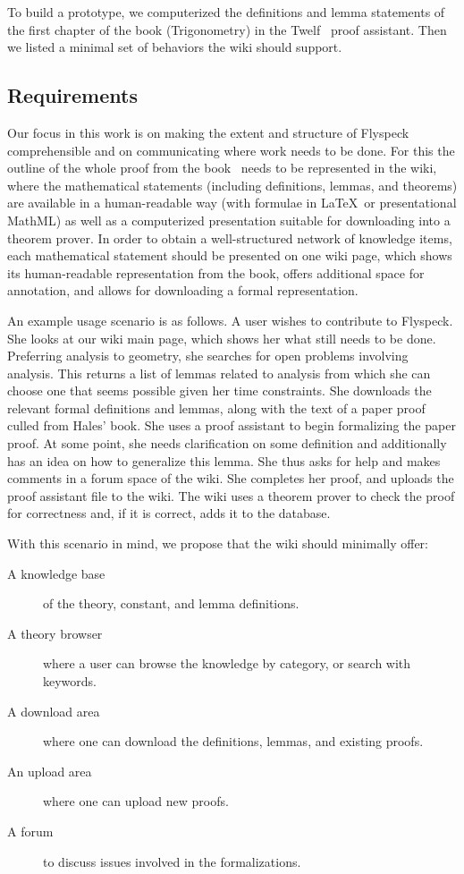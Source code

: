 To build a prototype, we computerized the definitions and lemma statements of
the first chapter of the book (Trigonometry) in the
Twelf~\cite{Schurmann:1999:Twelf} proof assistant.  Then we
listed a minimal set of behaviors the wiki should support.

\subsection{Requirements}

Our focus in this work is on making the extent and structure of
Flyspeck comprehensible and on communicating where work needs to be
done.  For this the outline of the whole proof from the
book~\cite{Hales:2007:FlyspeckBook} needs to be represented in the
wiki, where the mathematical statements (including definitions,
lemmas, and theorems) are available in a human-readable way (with
formulae in \LaTeX\ or presentational MathML) as well as a
computerized presentation suitable for downloading into a theorem
prover.  In order to obtain a well-structured network of knowledge
items, each mathematical statement should be presented on one wiki
page, which shows its human-readable representation from the book,
offers additional space for annotation, and allows for downloading a
formal representation.  

An example usage scenario is as follows. A user wishes to contribute to
Flyspeck.  She looks at our wiki main page, which shows her what still needs to
be done.  Preferring analysis to geometry, she searches for open problems
involving analysis.  This returns a list of lemmas related to analysis from
which she can choose one that seems possible given her time constraints. She
downloads the relevant formal definitions and lemmas, along with the text of a
paper proof culled from Hales' book.  She uses a proof assistant to begin
formalizing the paper proof.  At some point, she needs
clarification on some definition and additionally has an idea on how to
generalize this lemma.  She thus asks for help and makes comments in a forum
space of the wiki.  She completes her proof, and uploads the proof assistant
file to the wiki.  The wiki uses a theorem prover to check the proof for
correctness and, if it is correct, adds it to the database.

With this scenario in mind, we propose that the wiki should minimally offer: 
\begin{description}
\item[A knowledge base] of the theory, constant, and lemma definitions.
\item[A theory browser] where a user can browse the knowledge by category, or search with keywords.
\item[A download area] where one can download the definitions, lemmas, and existing proofs.
\item[An upload area] where one can upload new proofs.
\item[A forum] to discuss issues involved in the formalizations.
\end{description}

